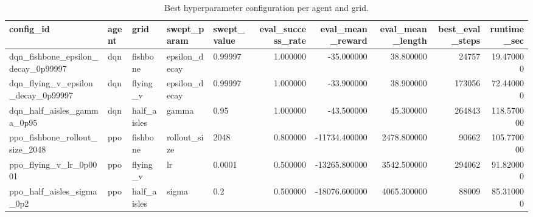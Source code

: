 \begin{table}
\caption{Best hyperparameter configuration per agent and grid.}
\label{tab:best_sweep_configs}
\begin{tabular}{lllllrrrrr}
\toprule
config_id & agent & grid & swept_param & swept_value & eval_success_rate & eval_mean_reward & eval_mean_length & best_eval_steps & runtime_sec \\
\midrule
dqn_fishbone_epsilon_decay_0p99997 & dqn & fishbone & epsilon_decay & 0.99997 & 1.000000 & -35.000000 & 38.800000 & 24757 & 19.470000 \\
dqn_flying_v_epsilon_decay_0p99997 & dqn & flying_v & epsilon_decay & 0.99997 & 1.000000 & -33.900000 & 38.900000 & 173056 & 72.440000 \\
dqn_half_aisles_gamma_0p95 & dqn & half_aisles & gamma & 0.95 & 1.000000 & -43.500000 & 45.300000 & 264843 & 118.570000 \\
ppo_fishbone_rollout_size_2048 & ppo & fishbone & rollout_size & 2048 & 0.800000 & -11734.400000 & 2478.800000 & 90662 & 105.770000 \\
ppo_flying_v_lr_0p0001 & ppo & flying_v & lr & 0.0001 & 0.500000 & -13265.800000 & 3542.500000 & 294062 & 91.820000 \\
ppo_half_aisles_sigma_0p2 & ppo & half_aisles & sigma & 0.2 & 0.500000 & -18076.600000 & 4065.300000 & 88009 & 85.310000 \\
\bottomrule
\end{tabular}
\end{table}

